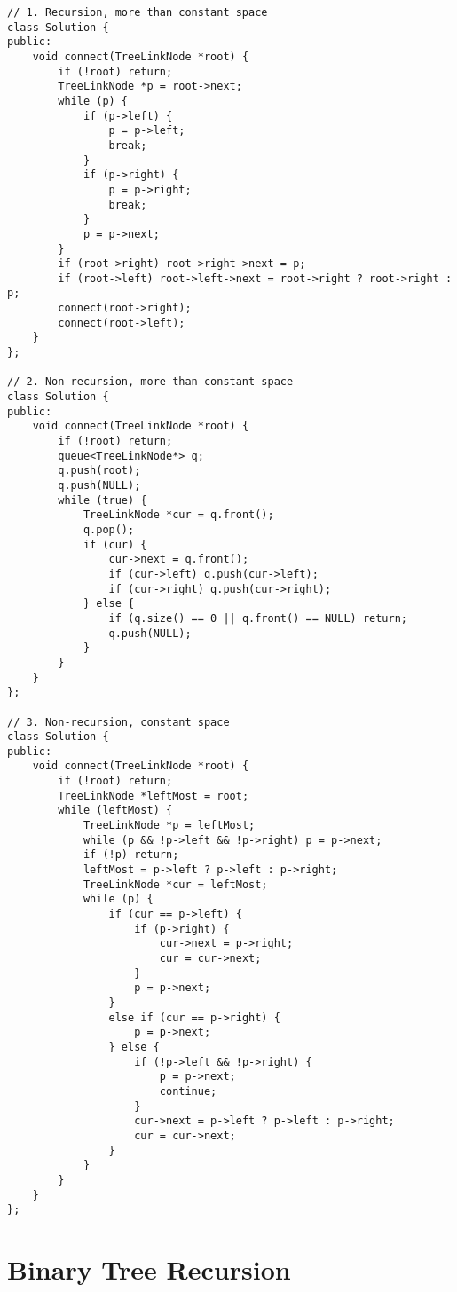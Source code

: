 \begin{lstlisting}
// 1. Recursion, more than constant space
class Solution {
public:
    void connect(TreeLinkNode *root) {
        if (!root) return;
        TreeLinkNode *p = root->next;
        while (p) {
            if (p->left) {
                p = p->left;
                break;
            }
            if (p->right) {
                p = p->right;
                break;
            }
            p = p->next;
        }
        if (root->right) root->right->next = p; 
        if (root->left) root->left->next = root->right ? root->right : p; 
        connect(root->right);
        connect(root->left);
    }
};

// 2. Non-recursion, more than constant space
class Solution {
public:
    void connect(TreeLinkNode *root) {
        if (!root) return;
        queue<TreeLinkNode*> q;
        q.push(root);
        q.push(NULL);
        while (true) {
            TreeLinkNode *cur = q.front();
            q.pop();
            if (cur) {
                cur->next = q.front();
                if (cur->left) q.push(cur->left);
                if (cur->right) q.push(cur->right);
            } else {
                if (q.size() == 0 || q.front() == NULL) return;
                q.push(NULL);
            }
        }
    }
};

// 3. Non-recursion, constant space
class Solution {
public:
    void connect(TreeLinkNode *root) {
        if (!root) return;
        TreeLinkNode *leftMost = root;
        while (leftMost) {
            TreeLinkNode *p = leftMost;
            while (p && !p->left && !p->right) p = p->next;
            if (!p) return;
            leftMost = p->left ? p->left : p->right;
            TreeLinkNode *cur = leftMost;
            while (p) {
                if (cur == p->left) {
                    if (p->right) {
                        cur->next = p->right;
                        cur = cur->next;
                    }
                    p = p->next;
                }
                else if (cur == p->right) {
                    p = p->next;
                } else {
                    if (!p->left && !p->right) {
                        p = p->next;
                        continue;
                    }
                    cur->next = p->left ? p->left : p->right;
                    cur = cur->next;
                }
            }
        }
    }
};
\end{lstlisting}


\section{Binary Tree Recursion}
